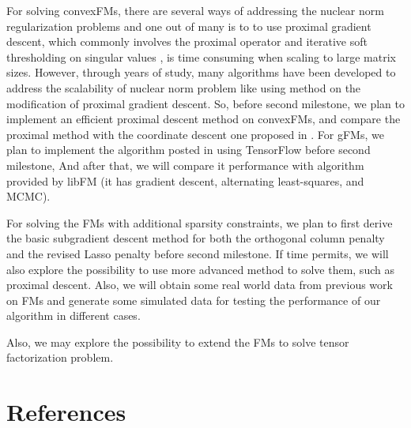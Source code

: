 \documentclass{article}
\begin{document}
For solving convexFMs, there are several ways of addressing the nuclear norm regularization problems and one out of many is to to use proximal gradient descent, which commonly involves the proximal operator and iterative soft thresholding on singular values \cite{lu3}, is time consuming when scaling to large matrix sizes. However, through years of study, many algorithms have been developed to address the scalability of nuclear norm problem like \cite{lu4} using method on the modification of proximal gradient descent. So, before second milestone, we plan to implement an efficient proximal descent method on convexFMs, and compare the proximal method with the coordinate descent one proposed in \cite{lu2}. For gFMs, we plan to implement the algorithm posted in \cite{lin2016non} using TensorFlow before second milestone, And after that, we will compare it performance with algorithm provided by libFM \cite{rendle2012factorization} (it has gradient descent, alternating least-squares, and MCMC).


For solving the FMs with additional sparsity constraints, we plan to first derive the basic subgradient descent method for both the orthogonal column penalty and the revised Lasso penalty before second milestone. If time permits, we will also explore the possibility to use more advanced method to solve them, such as proximal descent. Also, we will obtain some real world data from previous work on FMs and generate some simulated data for testing the performance of our algorithm in different cases.

Also, we may explore the possibility to extend the FMs to solve tensor factorization problem.






\section*{References}
\small{
\renewcommand{\section}[2]{}%
 

}
\end{document}
